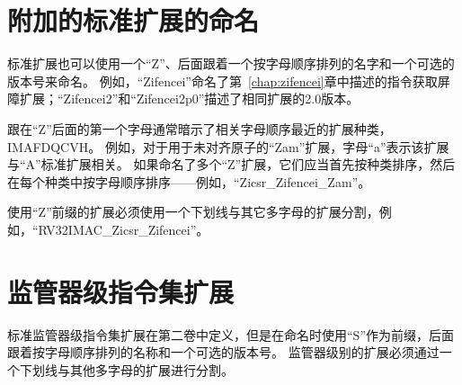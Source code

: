 \section{附加的标准扩展的命名}

标准扩展也可以使用一个“Z”、后面跟着一个按字母顺序排列的名字和一个可选的版本号来命名。
例如，“Zifencei”命名了第~\ref{chap:zifencei}章中描述的指令获取屏障扩展；“Zifencei2”和“Zifencei2p0”描述了相同扩展的2.0版本。

跟在“Z”后面的第一个字母通常暗示了相关字母顺序最近的扩展种类，IMAFDQCVH。
例如，对于用于未对齐原子的“Zam”扩展，字母“a”表示该扩展与“A”标准扩展相关。
如果命名了多个“Z”扩展，它们应当首先按种类排序，然后在每个种类中按字母顺序排序——例如，“Zicsr_Zifencei_Zam”。

使用“Z”前缀的扩展必须使用一个下划线与其它多字母的扩展分割，例如，“RV32IMAC_Zicsr_Zifencei”。

\section{监管器级指令集扩展}

标准监管器级指令集扩展在第二卷中定义，但是在命名时使用“S”作为前缀，后面跟着按字母顺序排列的名称和一个可选的版本号。
监管器级别的扩展必须通过一个下划线与其他多字母的扩展进行分割。

